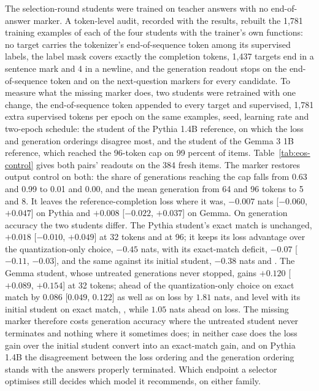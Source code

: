 The selection-round students were trained on teacher answers with no end-of-answer marker. A token-level
audit, recorded with the results, rebuilt the 1,781 training examples of each of the four students with
the trainer's own functions: no target carries the tokenizer's end-of-sequence token among its
supervised labels, the label mask covers exactly the completion tokens, 1,437 targets end in a sentence
mark and 4 in a newline, and the generation readout stops on the end-of-sequence token and on the
next-question markers for every candidate. To measure what the missing marker does, two students were retrained with one change, the
end-of-sequence token appended to every target and supervised, 1,781 extra supervised tokens per
epoch on the same examples, seed, learning rate and two-epoch schedule: the student of the Pythia
1.4B reference, on which the loss and generation orderings disagree most, and the student of the
Gemma 3 1B reference, which reached the 96-token cap on 99 percent of items.
Table~\ref{tab:eos-control} gives both pairs' readouts on the 384 fresh items. The marker restores
output control on both: the share of generations reaching the cap falls from 0.63 and 0.99 to 0.01
and 0.00, and the mean generation from 64 and 96 tokens to 5 and 8. It leaves the
reference-completion loss where it was, $-0.007$ nats [$-0.060$, $+0.047$] on Pythia and $+0.008$
[$-0.022$, $+0.037$] on Gemma. On generation accuracy the two students differ. The Pythia student's
exact match is unchanged, $+0.018$ [$-0.010$, $+0.049$] at 32 tokens and  at 96; it keeps its loss advantage over the quantization-only choice, $-0.45$ nats, with
its exact-match deficit, $-0.07$ [$-0.11$, $-0.03$], and the same against its initial student,
$-0.38$ nats and . The Gemma student, whose untreated generations never stopped, gains
$+0.120$ [$+0.089$, $+0.154$] at 32 tokens;  ahead of the quantization-only choice on exact match by $0.086$ [$0.049$, $0.122$] as well as on loss
by $1.81$ nats, and level with its initial student on exact match, ,
while $1.05$ nats ahead on loss. The missing marker therefore costs generation accuracy  where the
untreated student never terminates and nothing where it sometimes does; in neither case does the
loss gain over the initial student convert into an exact-match gain, and on Pythia 1.4B the
disagreement between the loss ordering and the generation ordering stands with the answers properly
terminated. Which endpoint a selector optimises still decides which model it recommends, on either family.


